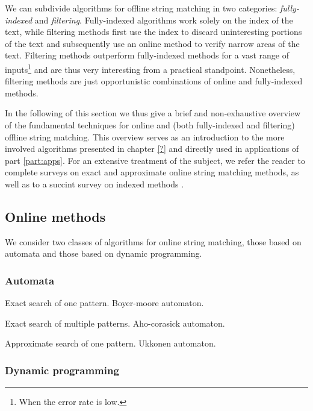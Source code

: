 We can subdivide algorithms for offline string matching in two categories: \emph{fully-indexed} and \emph{filtering}.
Fully-indexed algorithms work solely on the index of the text, while filtering methods first use the index to discard uninteresting portions of the text and subsequently use an online method to verify narrow areas of the text.
Filtering methods outperform fully-indexed methods for a vast range of inputs\footnote{When the error rate is low.} and are thus very interesting from a practical standpoint. Nonetheless, filtering methods are just opportunistic combinations of online and fully-indexed methods.

In the following of this section we thus give a brief and non-exhaustive overview of the fundamental techniques for online and (both fully-indexed and filtering) offline string matching.
This overview serves as an introduction to the more involved algorithms presented in chapter \ref{?} and directly used in applications of part \ref{part:apps}.
For an extensive treatment of the subject, we refer the reader to complete surveys on exact \cite{Faro2013} and approximate \cite{Navarro1999} online string matching methods, as well as to a succint survey on indexed methods \cite{Navarro2001}.


\subsection{Online methods}

We consider two classes of algorithms for online string matching, those based on automata and those based on dynamic programming.

\subsubsection{Automata}

Exact search of one pattern. Boyer-moore automaton.

Exact search of multiple patterns. Aho-corasick automaton.

Approximate search of one pattern. Ukkonen automaton.


\subsubsection{Dynamic programming}


